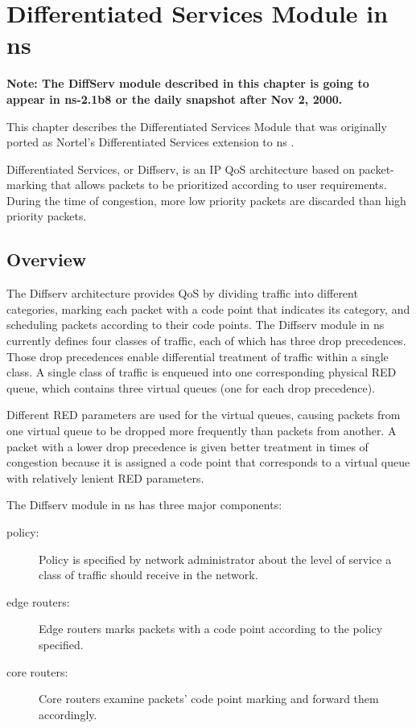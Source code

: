 %
%
%
\chapter{Differentiated Services Module in ns}
\label{chap:diffserv}

\textbf{Note: The DiffServ module described in this chapter is going to appear
in ns-2.1b8 or the daily snapshot after Nov 2, 2000.}

This chapter describes the Differentiated Services Module that was originally 
ported as Nortel's Differentiated Services extension to ns \cite{Diffserv}.

Differentiated Services, or Diffserv, is an IP QoS architecture based on 
packet-marking that allows packets to be prioritized according to user 
requirements.  During the time of congestion, more low priority packets are 
discarded than high priority packets.

\section{Overview}
\label{sec:diffservoverview}

The Diffserv architecture provides QoS by dividing traffic into different 
categories, marking each packet with a code point that indicates its category, 
and scheduling packets according to their code points. The Diffserv module in 
ns currently defines four classes of traffic, each of which has three drop 
precedences.  Those drop precedences enable differential treatment of traffic 
within a single class. A single class of traffic is enqueued into one 
corresponding physical RED queue, which contains three virtual queues (one for
each drop precedence).

Different RED parameters are used for the virtual queues, causing packets from 
one virtual queue to be dropped more frequently than packets from another.  A 
packet with a lower drop precedence is given better treatment in times of 
congestion because it is assigned a code point that corresponds to a virtual 
queue with relatively lenient RED parameters.  

The Diffserv module in ns has three major components:
\begin{description}

\item [policy:]
Policy is specified by network administrator about the level of service a class
of traffic should receive in the network.  

\item [edge routers:]
Edge routers marks packets with a code point according to the policy specified.

\item [core routers:]
Core routers examine packets' code point marking and forward them accordingly.

\end{description}

